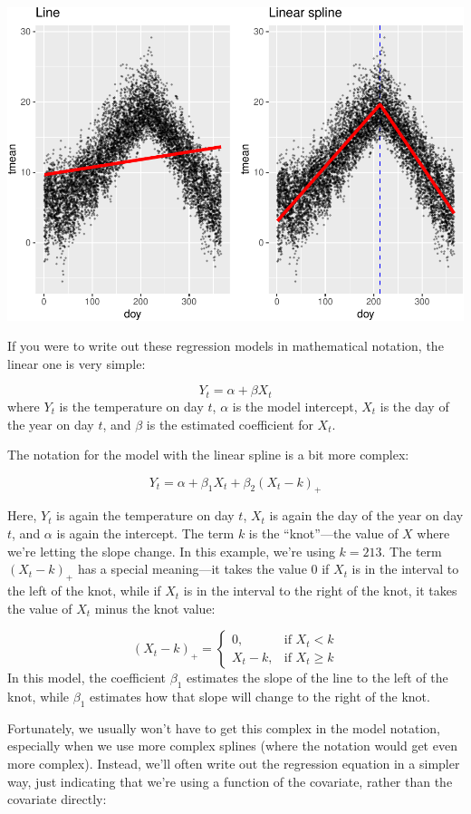 \documentclass[
]{book}
\begin{document}
\includegraphics{adv_epi_analysis_files/figure-latex/unnamed-chunk-42-1.pdf}

If you were to write out these regression models in mathematical notation, the
linear one is very simple:

\[
Y_t = \alpha + \beta X_t
\]
where \(Y_t\) is the temperature on day \(t\), \(\alpha\) is the model intercept,
\(X_t\) is the day of the year on day \(t\), and \(\beta\) is the estimated coefficient
for \(X_t\).

The notation for the model with the linear spline is a bit more complex:

\[
Y_t = \alpha + \beta_1 X_t + \beta_2 (X_t - k)_+
\]

Here, \(Y_t\) is again the temperature on day \(t\), \(X_t\) is again the day of the year
on day \(t\), and \(\alpha\) is again the intercept. The term \(k\) is the ``knot''---the
value of \(X\) where we're letting the slope change. In this example, we're using
\(k = 213\). The term \((X_t - k)_+\) has a special meaning---it takes the value
0 if \(X_t\) is in the interval to the left of the knot, while if \(X_t\) is in the
interval to the right of the knot, it takes the value of \(X_t\) minus the knot
value:

\[ 
(X_t - k)_+ =
\begin{cases}
0, & \mbox{if } X_t < k \\
X_t - k, & \mbox{if } X_t \ge k 
\end{cases}
\]
In this model, the coefficient \(\beta_1\) estimates the slope of the line to the
left of the knot, while \(\beta_1\) estimates how that slope will change to the
right of the knot.

Fortunately, we usually won't have to get this complex in the model notation,
especially when we use more complex splines (where the notation would get even
more complex). Instead, we'll often write out the
regression equation in a simpler way, just indicating that we're using a function
of the covariate, rather than the covariate directly:
\end{document}
